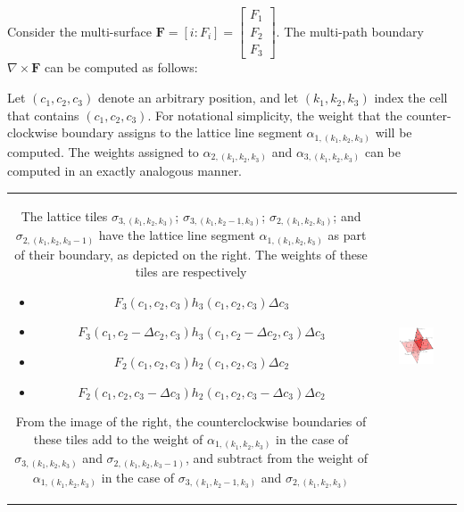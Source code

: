 Consider the multi-surface \(\mathbf{F} = [i : F_i] = \begin{bmatrix} F_1 \\ F_2 \\ F_3 \end{bmatrix}\). The multi-path boundary \(\nabla \times \mathbf{F}\) can be computed as follows:

Let \((c_1, c_2, c_3)\) denote an arbitrary position, and let \((k_1, k_2, k_3)\) index the cell that contains \((c_1, c_2, c_3)\). For notational simplicity, the weight that the counter-clockwise boundary assigns to the lattice line segment \(\alpha_{1, (k_1, k_2, k_3)}\) will be computed. The weights assigned to \(\alpha_{2, (k_1, k_2, k_3)}\) and \(\alpha_{3, (k_1, k_2, k_3)}\) can be computed in an exactly analogous manner. 

\begin{tabular}{cc}
\parbox{0.5\textwidth}{
The lattice tiles \(\sigma_{3, (k_1, k_2, k_3)}\); \(\sigma_{3, (k_1, k_2-1, k_3)}\); \(\sigma_{2, (k_1, k_2, k_3)}\); and \(\sigma_{2, (k_1, k_2, k_3-1)}\) have the lattice line segment \(\alpha_{1, (k_1, k_2, k_3)}\) as part of their boundary, as depicted on the right. The weights of these tiles are respectively 
\begin{itemize}
\item \(F_3(c_1,c_2,c_3)h_3(c_1,c_2,c_3)\Delta c_3\) 
\item \(F_3(c_1,c_2 - \Delta c_2,c_3)h_3(c_1,c_2 - \Delta c_2,c_3)\Delta c_3\) 
\item \(F_2(c_1,c_2,c_3)h_2(c_1,c_2,c_3)\Delta c_2\)
\item \(F_2(c_1,c_2,c_3 - \Delta c_3)h_2(c_1,c_2,c_3 - \Delta c_3)\Delta c_2\)   
\end{itemize}    
From the image of the right, the counterclockwise boundaries of these tiles add to the weight of \(\alpha_{1, (k_1, k_2, k_3)}\) in the case of \(\sigma_{3, (k_1, k_2, k_3)}\) and \(\sigma_{2, (k_1, k_2, k_3-1)}\), and subtract from the weight of \(\alpha_{1, (k_1, k_2, k_3)}\) in the case of \(\sigma_{3, (k_1, k_2-1, k_3)}\) and \(\sigma_{2, (k_1, k_2, k_3)}\)
} & \parbox{0.5\textwidth}{
\includegraphics[width = 0.5\textwidth]{Coordinate_systems/surface_boundary_cell}
}
\end{tabular}

